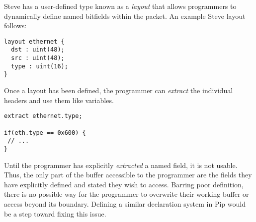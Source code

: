 Steve has a user-defined type known as a \textit{layout} that allows programmers to dynamically define named bitfields within the packet. An example Steve layout follows:
\begin{verbatim}
layout ethernet {
  dst : uint(48);
  src : uint(48);
  type : uint(16);
}
\end{verbatim}
Once a layout has been defined, the programmer can \textit{extract} the individual headers and use them like variables.
\begin{verbatim}
extract ethernet.type;

if(eth.type == 0x600) {
 // ...
}
\end{verbatim}
Until the programmer has explicitly \textit{extracted} a named field, it is not usable. Thus, the only part of the buffer accessible to the programmer are the fields they have explicitly defined and stated they wish to access. Barring poor definition, there is no possible way for the programmer to overwrite their working buffer or access beyond its boundary. Defining a similar declaration system in Pip would be a step toward fixing this issue.
